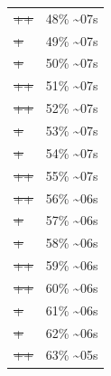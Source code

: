 \documentclass[12pt]{article}
\begin{document}
\begin{center}
\begin{tabular}{ll}
\sout{\sout{\sout{\sout{\sout{\sout{\sout{\sout{\sout{\sout{\sout{++}}}}}}}}}}} & 48\% \textasciitilde{}07s\\
\sout{\sout{\sout{\sout{\sout{\sout{\sout{\sout{\sout{\sout{\sout{\sout{+}}}}}}}}}}}} & 49\% \textasciitilde{}07s\\
\sout{\sout{\sout{\sout{\sout{\sout{\sout{\sout{\sout{\sout{\sout{\sout{+}}}}}}}}}}}} & 50\% \textasciitilde{}07s\\
\sout{\sout{\sout{\sout{\sout{\sout{\sout{\sout{\sout{\sout{\sout{\sout{++}}}}}}}}}}}} & 51\% \textasciitilde{}07s\\
\sout{\sout{\sout{\sout{\sout{\sout{\sout{\sout{\sout{\sout{\sout{\sout{++}}}}}}}}}}}} & 52\% \textasciitilde{}07s\\
\sout{\sout{\sout{\sout{\sout{\sout{\sout{\sout{\sout{\sout{\sout{\sout{\sout{+}}}}}}}}}}}}} & 53\% \textasciitilde{}07s\\
\sout{\sout{\sout{\sout{\sout{\sout{\sout{\sout{\sout{\sout{\sout{\sout{\sout{+}}}}}}}}}}}}} & 54\% \textasciitilde{}07s\\
\sout{\sout{\sout{\sout{\sout{\sout{\sout{\sout{\sout{\sout{\sout{\sout{\sout{++}}}}}}}}}}}}} & 55\% \textasciitilde{}07s\\
\sout{\sout{\sout{\sout{\sout{\sout{\sout{\sout{\sout{\sout{\sout{\sout{\sout{++}}}}}}}}}}}}} & 56\% \textasciitilde{}06s\\
\sout{\sout{\sout{\sout{\sout{\sout{\sout{\sout{\sout{\sout{\sout{\sout{\sout{\sout{+}}}}}}}}}}}}}} & 57\% \textasciitilde{}06s\\
\sout{\sout{\sout{\sout{\sout{\sout{\sout{\sout{\sout{\sout{\sout{\sout{\sout{\sout{+}}}}}}}}}}}}}} & 58\% \textasciitilde{}06s\\
\sout{\sout{\sout{\sout{\sout{\sout{\sout{\sout{\sout{\sout{\sout{\sout{\sout{\sout{++}}}}}}}}}}}}}} & 59\% \textasciitilde{}06s\\
\sout{\sout{\sout{\sout{\sout{\sout{\sout{\sout{\sout{\sout{\sout{\sout{\sout{\sout{++}}}}}}}}}}}}}} & 60\% \textasciitilde{}06s\\
\sout{\sout{\sout{\sout{\sout{\sout{\sout{\sout{\sout{\sout{\sout{\sout{\sout{\sout{\sout{+}}}}}}}}}}}}}}} & 61\% \textasciitilde{}06s\\
\sout{\sout{\sout{\sout{\sout{\sout{\sout{\sout{\sout{\sout{\sout{\sout{\sout{\sout{\sout{+}}}}}}}}}}}}}}} & 62\% \textasciitilde{}06s\\
\sout{\sout{\sout{\sout{\sout{\sout{\sout{\sout{\sout{\sout{\sout{\sout{\sout{\sout{\sout{++}}}}}}}}}}}}}}} & 63\% \textasciitilde{}05s\\

\end{tabular}
\end{center}
\end{document}
